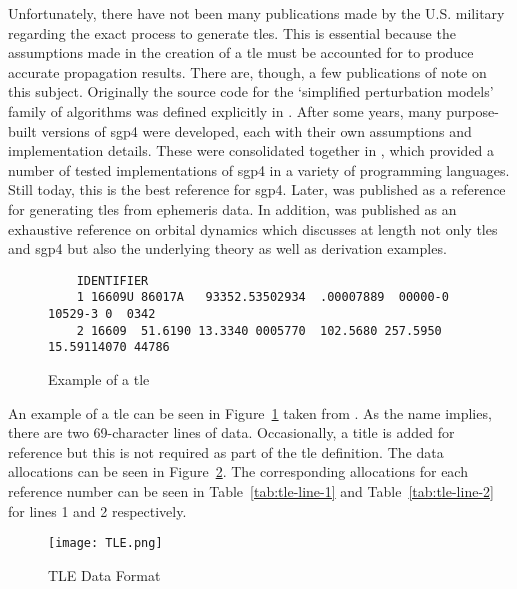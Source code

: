 Unfortunately, there have not been many publications made by the U.S. military
regarding the exact process to generate \glspl{tle}. This is essential because
the assumptions made in the creation of a \gls{tle} must be accounted for to
produce accurate propagation results. There are, though, a few publications of
note on this subject. Originally the source code for the `simplified
perturbation models' family of algorithms was defined explicitly in
\cite{hoots_spacetrack_1980}.  After some years, many purpose-built versions of
\gls{sgp4} were developed, each with their own assumptions and implementation
details. These were consolidated together in \cite{vallado_revisiting_2006},
which provided a number of tested implementations of \gls{sgp4} in a variety of
programming languages. Still today, this is the best reference for \gls{sgp4}.
Later, \cite{vallado_sgp4_2008} was published as a reference for generating
\glspl{tle} from ephemeris data. In addition, \cite{vallado_fundamentals_2001}
was published as an exhaustive reference on orbital dynamics which discusses at
length not only \glspl{tle} and \gls{sgp4} but also the underlying theory as
well as derivation examples.



\begin{figure}[h]
    \begin{verbatim}
    IDENTIFIER
    1 16609U 86017A   93352.53502934  .00007889  00000-0  10529-3 0  0342
    2 16609  51.6190 13.3340 0005770  102.5680 257.5950 15.59114070 44786
    \end{verbatim} 
    \caption{Example of a \gls{tle}}
    \label{fig:tle-ex} 
\end{figure}

An example of a \gls{tle} can be seen in Figure~\ref{fig:tle-ex} taken from
\cite{vallado_fundamentals_2001}.  As the name implies, there are two
69-character lines of data. Occasionally, a title is added for reference but
this is not required as part of the \gls{tle} definition. The data allocations
can be seen in Figure~\ref{fig:tle-legend}. The corresponding allocations for
each reference number can be seen in Table~\ref{tab:tle-line-1} and
Table~\ref{tab:tle-line-2} for lines 1 and 2 respectively.

\begin{figure}[h]
    \centering
    \texttt{[image: TLE.png]} 
    \caption{TLE Data Format}
    \label{fig:tle-legend} 
\end{figure}


